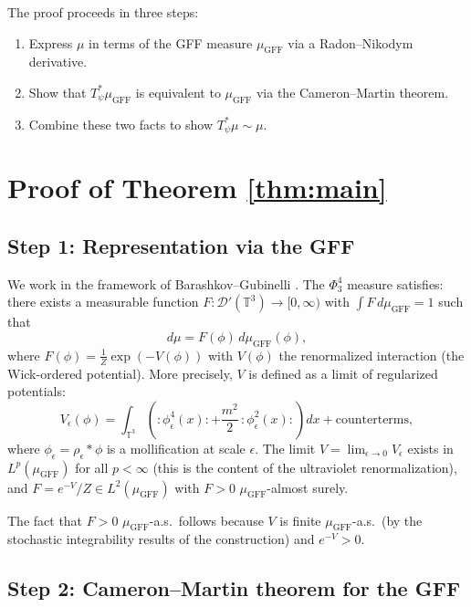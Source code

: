\documentclass[12pt]{article}
\begin{document}
The proof proceeds in three steps:
\begin{enumerate}
\item Express $\mu$ in terms of the GFF measure $\mu_{\mathrm{GFF}}$ via a Radon--Nikodym derivative.
\item Show that $T_\psi^* \mu_{\mathrm{GFF}}$ is equivalent to $\mu_{\mathrm{GFF}}$ via the Cameron--Martin theorem.
\item Combine these two facts to show $T_\psi^* \mu \sim \mu$.
\end{enumerate}

\section{Proof of Theorem \ref{thm:main}}

\subsection{Step 1: Representation via the GFF}

We work in the framework of Barashkov--Gubinelli \cite{BG2020}. The $\Phi^4_3$ measure satisfies: there exists a measurable function $F: \mathcal{D}'(\mathbb{T}^3) \to [0, \infty)$ with $\int F \, d\mu_{\mathrm{GFF}} = 1$ such that
\begin{equation}\label{eq:RN}
d\mu = F(\phi) \, d\mu_{\mathrm{GFF}}(\phi),
\end{equation}
where $F(\phi) = \frac{1}{Z} \exp(-V(\phi))$ with $V(\phi)$ the renormalized interaction (the Wick-ordered potential). More precisely, $V$ is defined as a limit of regularized potentials:
\[
V_\epsilon(\phi) = \int_{\mathbb{T}^3} \left(:\!\phi_\epsilon^4(x)\!: + \frac{m^2}{2}\,:\!\phi_\epsilon^2(x)\!:\right) dx + \text{counterterms},
\]
where $\phi_\epsilon = \rho_\epsilon * \phi$ is a mollification at scale $\epsilon$. The limit $V = \lim_{\epsilon \to 0} V_\epsilon$ exists in $L^p(\mu_{\mathrm{GFF}})$ for all $p < \infty$ (this is the content of the ultraviolet renormalization), and $F = e^{-V}/Z \in L^2(\mu_{\mathrm{GFF}})$ with $F > 0$ $\mu_{\mathrm{GFF}}$-almost surely.

The fact that $F > 0$ $\mu_{\mathrm{GFF}}$-a.s.\ follows because $V$ is finite $\mu_{\mathrm{GFF}}$-a.s.\ (by the stochastic integrability results of the construction) and $e^{-V} > 0$.

\subsection{Step 2: Cameron--Martin theorem for the GFF}
\end{document}

